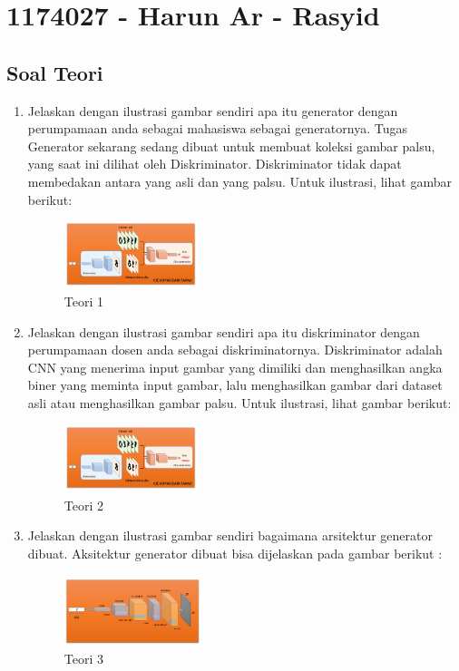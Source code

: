 \section{1174027 - Harun Ar - Rasyid}
\subsection{Soal Teori}
\begin{enumerate}
    \item Jelaskan dengan ilustrasi gambar sendiri apa itu generator dengan perumpamaan anda sebagai mahasiswa sebagai generatornya.
    \hfill\break
    Tugas Generator sekarang sedang dibuat untuk membuat koleksi gambar palsu, yang saat ini dilihat oleh Diskriminator. Diskriminator tidak dapat membedakan antara yang asli dan yang palsu. Untuk ilustrasi, lihat gambar berikut: 
    \begin{figure}[H]
		\includegraphics[width=4cm]{figures/1174027/8/teori1,2.png}
		\centering
		\caption{Teori 1}
    \end{figure}

    \item Jelaskan dengan ilustrasi gambar sendiri apa itu diskriminator dengan perumpamaan dosen anda sebagai diskriminatornya.
    \hfill\break
    Diskriminator adalah CNN yang menerima input gambar yang dimiliki dan menghasilkan angka biner yang meminta input gambar, lalu menghasilkan gambar dari dataset asli atau menghasilkan gambar palsu. Untuk ilustrasi, lihat gambar berikut: 
    \begin{figure}[H]
		\includegraphics[width=4cm]{figures/1174027/8/teori1,2.png}
		\centering
		\caption{Teori 2}
    \end{figure}

    \item Jelaskan dengan ilustrasi gambar sendiri bagaimana arsitektur generator dibuat.
	\hfill\break
    Aksitektur generator dibuat bisa dijelaskan pada gambar berikut :
    \begin{figure}[H]
		\includegraphics[width=4cm]{figures/1174027/8/teori3.png}
		\centering
		\caption{Teori 3}
    \end{figure}


\end{enumerate}
